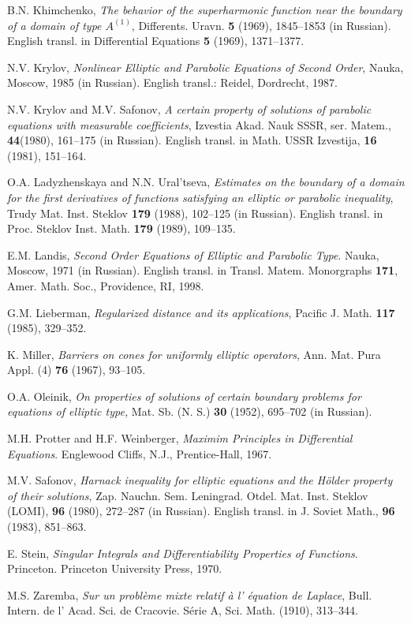 \documentclass[regno,12pt]{amsart}
\theoremstyle{definition}
\theoremstyle{remark}
\begin{document}
\begin{thebibliography}{}
 B.N. Khimchenko, \emph{The behavior of the superharmonic function near the boundary of a domain of type $A^{(1)}$}, Differents. Uravn. \textbf{5}  (1969), 1845--1853 (in Russian). English transl. in Differential Equations \textbf{5} (1969), 1371--1377.

  N.V. Krylov, \emph{Nonlinear Elliptic and Parabolic
Equations of Second Order}, Nauka, Moscow, 1985 (in Russian). English transl.: Reidel, Dordrecht, 1987.

  N.V. Krylov and M.V. Safonov, \emph{A certain property of solutions of parabolic equations with measurable coefficients}, Izvestia Akad. Nauk SSSR, ser. Matem., \textbf{44}(1980), 161--175 (in Russian). English transl. in Math. USSR Izvestija, \textbf{16} (1981), 151--164.

 O.A. Ladyzhenskaya and N.N. Ural'tseva, \emph{Estimates on the boundary of a domain for the first derivatives of functions satisfying an elliptic or parabolic inequality}, Trudy Mat. Inst. Steklov \textbf{179} (1988), 102--125 (in Russian). English transl. in Proc. Steklov Inst. Math. \textbf{179} (1989), 109--135.
    
  E.M. Landis, \emph{Second Order Equations of Elliptic and Parabolic Type}. Nauka, Moscow, 1971 (in Russian). English transl. in Transl. Matem. Monorgraphs \textbf{171}, Amer. Math. Soc., Providence, RI, 1998.

 G.M. Lieberman, \emph{Regularized distance and its applications}, Pacific J. Math. \textbf{117} (1985), 329--352.

 K. Miller, \emph{Barriers on cones for uniformly elliptic operators}, Ann. Mat. Pura Appl. (4) \textbf{76} (1967), 93--105.

 O.A. Oleinik, \emph{On properties of solutions of certain boundary problems for equations of elliptic type,} Mat. Sb. (N. S.) \textbf{30} (1952), 695--702 (in Russian).

 M.H. Protter and H.F. Weinberger, \emph{Maximim Principles in Differential Equations}. Englewood Cliffs, N.J., Prentice-Hall, 1967.

 M.V. Safonov, \emph{Harnack inequality for elliptic equations and the H\"older property of their solutions}, Zap. Nauchn. Sem. Leningrad. Otdel. Mat. Inst. Steklov (LOMI), \textbf{96} (1980), 272--287 (in Russian). English transl. in J. Soviet Math., \textbf{96} (1983), 851--863.
    
 E. Stein, \emph{Singular Integrals and Differentiability Properties of Functions}. Princeton. Princeton University Press, 1970.

 M.S. Zaremba, \emph{Sur un probl\`eme mixte relatif \`a l' \'equation de Laplace}, Bull. Intern. de l' Acad. Sci. de Cracovie. S\'erie A, Sci. Math. (1910), 313--344.

\end{thebibliography}{}
\end{document}
